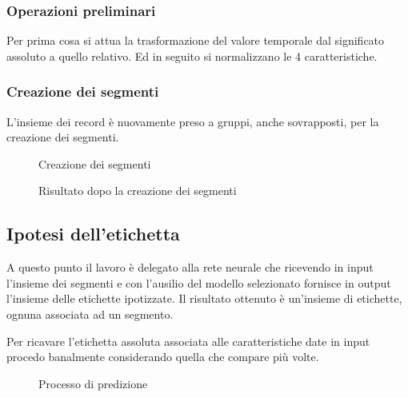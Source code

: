 \subsubsection{Operazioni preliminari}
Per prima cosa si attua la trasformazione del valore temporale dal significato assoluto a quello relativo.
Ed in seguito si normalizzano le 4 caratteristiche.


\subsubsection{Creazione dei segmenti}
L'insieme dei record è nuovamente preso a gruppi, anche sovrapposti, per la creazione dei segmenti.

\begin{figure}[H]
    \centering
    
    \caption{Creazione dei segmenti}
    \label{fig:create_segments}
\end{figure}

\begin{figure}[H]
    \centering
    
    \caption{Risultato dopo la creazione dei segmenti}
    \label{fig:segments}
\end{figure}



\subsection{Ipotesi dell'etichetta}
A questo punto il lavoro è delegato alla rete neurale che ricevendo in input l'insieme dei segmenti 
e con l'ausilio del modello selezionato fornisce in output l'insieme delle etichette ipotizzate.
Il risultato ottenuto è un'insieme di etichette, ognuna associata ad un segmento. 

Per ricavare l'etichetta assoluta associata alle caratteristiche date in input procedo banalmente 
considerando quella che compare più volte.

\begin{figure}[H]
    \centering
    
    \caption{Processo di predizione}
    \label{fig:prediction}
\end{figure}
